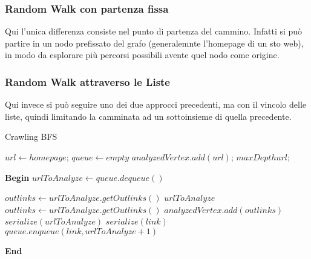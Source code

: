 \subsubsection{Random Walk con partenza fissa}
Qui l'unica differenza consiste nel punto di partenza del cammino. Infatti si può partire in un nodo prefissato del grafo (generalemnte l'homepage di un sto web), in modo da esplorare più percorsi possibili avente quel nodo come origine.

\subsubsection{Random Walk attraverso le Liste}
Qui invece si può seguire uno dei due approcci precedenti, ma con il vincolo delle liste, quindi limitando la camminata ad un sottoinsieme di quella precedente.

\begin{algorithm}[H]
\caption{Crawling BFS}
\begin{algorithmic}

	\State $url\gets homepage$;	
	\State $queue\gets empty$ 
	\State $analyzedVertex.add(url)$;	
	\State $maxDepth url$;	
 	
 	\vspace*{+0.5cm}
 	
	\State \textbf{Begin}
		\State $urlToAnalyze\gets queue.dequeue()$
		
			\State $outlinks \gets urlToAnalyze.getOutlinks()$
		\Else
			\State $urlToAnalyze$
		\EndIf
			\State $outlinks \gets urlToAnalyze.getOutlinks()$
			\State $analyzedVertex.add(outlinks)$
			\State $serialize(urlToAnalyze)$
				\State $serialize(link)$
				\State $queue.enqueue(link, urlToAnalyze + 1)$
			\EndFor
		\EndIf
		
	\EndWhile
	\State \textbf{End}
\end{algorithmic}
\end{algorithm}

